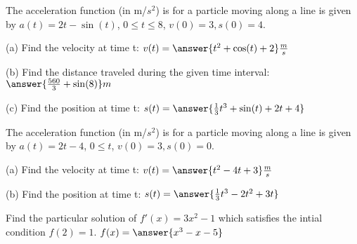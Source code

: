 \documentclass{ximera}
\begin{document}
\begin{exercise}
The acceleration function (in m/$s^2$) is for a particle moving along a line is given by $a(t)=2t-\sin(t)$, $0\leq t\leq 8$, $v(0)=3, s(0)=4$.

(a) Find the velocity at time t: $v(t)=\answer{t^2+\cos(t)+2} \frac{m}{s}$

(b) Find the distance traveled during the given time interval: $\answer{\frac{560}{3}+\sin(8)} m$

(c) Find the position at time t: $s(t)=\answer{\frac{1}{3}t^3+\sin(t)+2t+4}$
\end{exercise}

\begin{exercise}
The acceleration function (in m/$s^2$) is for a particle moving along a line is given by $a(t)=2t-4$, $0\leq t$, $v(0)=3, s(0)=0$.

(a) Find the velocity at time t: $v(t)=\answer{t^2-4t+3} \frac{m}{s}$

(b) Find the position at time t: $s(t)=\answer{\frac{1}{3}t^3-2t^2+3t}$
\end{exercise}

\begin{exercise}
Find the particular solution of $f'(x)=3x^2-1$ which satisfies the intial condition $f(2)=1$. $f(x)=\answer{x^3-x-5}$
\end{exercise}
\end{document}
